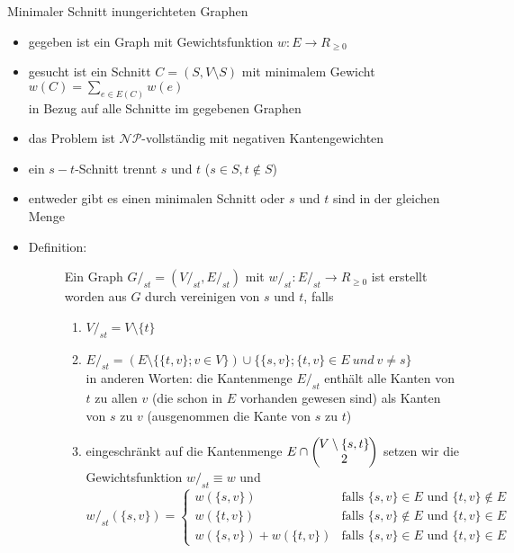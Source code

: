 \begin{TOPbreak}{Minimaler Schnitt in}{ungerichteten Graphen}
	\up\up\begin{itemize}
		\item gegeben ist ein Graph mit Gewichtsfunktion $w : E \rightarrow R_{\geq 0}$
		\item gesucht ist ein Schnitt $C=(S, V\setminus S)$ mit minimalem Gewicht $w(C)= \sum\limits_{e \in E(C)} w(e)$\\in Bezug auf alle Schnitte im gegebenen Graphen
		\item das Problem ist $\mathcal{NP}$-vollständig mit negativen Kantengewichten
		\item ein $s-t$-Schnitt trennt $s$ und $t$ ($s\in S, t \notin S$)
		\item entweder gibt es einen minimalen Schnitt oder $s$ und $t$ sind in der gleichen Menge
		\item \begin{description}
			\item[Definition:] Ein Graph $G/_{st} = (V/_{st},E/_{st})$ mit $w/_{st} : E/_{st} \rightarrow R_{\geq 0}$ ist erstellt worden aus $G$ durch vereinigen von $s$ und $t$, falls
			\begin{enumerate}
				\item $V/_{st} = V\setminus \{t\}$
				\item $E/_{st} = (E\setminus\{\{t,v\}; v \in V\}) \cup \{\{s,v\}; \{t,v\}\in E~und~v\neq s\}$\\
				in anderen Worten: die Kantenmenge $E/_{st}$ enthält alle Kanten von $t$ zu allen $v$ (die schon in $E$ vorhanden gewesen sind) als Kanten von $s$ zu $v$ (ausgenommen die Kante von $s$ zu $t$)
				\item eingeschränkt auf die Kantenmenge $E\cap \left(\hspace*{-0.2cm}\begin{array}{c}V\setminus\{s,t\}\\2\end{array}\hspace*{-0.2cm}\right)$ setzen wir die Gewichtsfunktion $w/_{st} \equiv w$ und
					\[w/_{st}(\{s,v\})= \left\{
						\begin{array}{ll}
							w(\{s,v\}) & \text{falls }\{s,v\}\in E \text{ und } \{t,v\} \notin E\\
							w(\{t,v\}) & \text{falls }\{s,v\}\notin E \text{ und } \{t,v\} \in E\\
							w(\{s,v\})+w(\{t,v\}) & \text{falls }\{s,v\}\in E \text{ und } \{t,v\} \in E
						\end{array}
\]
\end{enumerate}
\end{description}
\end{itemize}
\end{TOPbreak}
